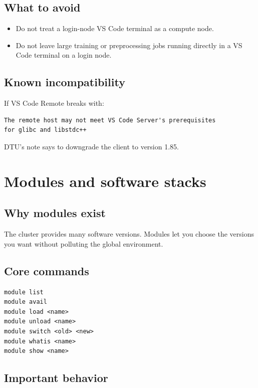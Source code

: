 \documentclass[11pt,a4paper]{article}
\begin{document}
\subsection{What to avoid}

\begin{itemize}[leftmargin=1.5em]
  \item Do not treat a login-node VS Code terminal as a compute node.
  \item Do not leave large training or preprocessing jobs running directly in a VS Code terminal on a login node.
\end{itemize}

\subsection{Known incompatibility}

If VS Code Remote breaks with:

\begin{lstlisting}[style=shell]
The remote host may not meet VS Code Server's prerequisites
for glibc and libstdc++
\end{lstlisting}

DTU's note says to downgrade the client to version 1.85.

\section{Modules and software stacks}

\subsection{Why modules exist}

The cluster provides many software versions. Modules let you choose the versions you want without polluting the global environment.

\subsection{Core commands}

\begin{lstlisting}[style=shell]
module list
module avail
module load <name>
module unload <name>
module switch <old> <new>
module whatis <name>
module show <name>
\end{lstlisting}

\subsection{Important behavior}
\end{document}
